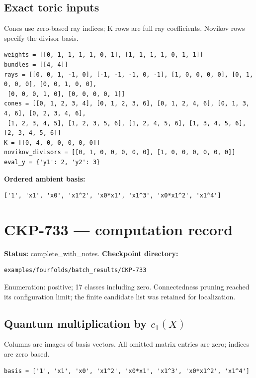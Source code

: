 \documentclass[10pt,a4paper]{article}
\begin{document}
\subsection*{Exact toric inputs}
Cones use zero-based ray indices; K rows are full ray coefficients. Novikov rows specify the divisor basis.

\begin{lstlisting}
weights = [[0, 1, 1, 1, 1, 0, 1], [1, 1, 1, 1, 0, 1, 1]]
bundles = [[4, 4]]
rays = [[0, 0, 1, -1, 0], [-1, -1, -1, 0, -1], [1, 0, 0, 0, 0], [0, 1, 0, 0, 0], [0, 0, 1, 0, 0],
 [0, 0, 0, 1, 0], [0, 0, 0, 0, 1]]
cones = [[0, 1, 2, 3, 4], [0, 1, 2, 3, 6], [0, 1, 2, 4, 6], [0, 1, 3, 4, 6], [0, 2, 3, 4, 6],
 [1, 2, 3, 4, 5], [1, 2, 3, 5, 6], [1, 2, 4, 5, 6], [1, 3, 4, 5, 6], [2, 3, 4, 5, 6]]
K = [[0, 4, 0, 0, 0, 0, 0]]
novikov_divisors = [[0, 1, 0, 0, 0, 0, 0], [1, 0, 0, 0, 0, 0, 0]]
eval_y = {'y1': 2, 'y2': 3}
\end{lstlisting}

\textbf{Ordered ambient basis:}
\begin{lstlisting}
['1', 'x1', 'x0', 'x1^2', 'x0*x1', 'x1^3', 'x0*x1^2', 'x1^4']
\end{lstlisting}

\clearpage\section*{CKP-733 --- computation record}
\textbf{Status:} complete\_with\_notes.
\textbf{Checkpoint directory:}
\begin{lstlisting}
examples/fourfolds/batch_results/CKP-733
\end{lstlisting}

Enumeration: positive; 17 classes including zero.
Connectedness pruning reached its configuration limit; the finite candidate list was retained for localization.
\subsection*{Quantum multiplication by $c_1(X)$}
Columns are images of basis vectors. All omitted matrix entries are zero; indices are zero based.

\begin{lstlisting}
basis = ['1', 'x1', 'x0', 'x1^2', 'x0*x1', 'x1^3', 'x0*x1^2', 'x1^4']
\end{lstlisting}
\end{document}
